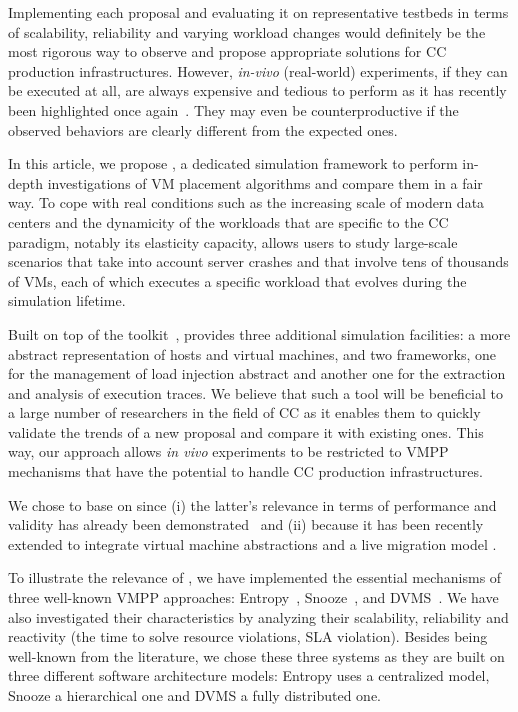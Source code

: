 Implementing each proposal and evaluating it on representative
testbeds in terms of scalability, reliability and varying workload
changes would definitely be the most rigorous way to observe and
propose appropriate solutions for CC production infrastructures.
However, \textit{in-vivo} (\ie real-world) experiments, if they can be
executed at all, are always expensive and tedious to perform as it has
recently been highlighted once again~\cite{barker:pitfalls}. They may
even be counterproductive if the observed behaviors are clearly
different from the expected ones.

In this article, we propose \vmps, a dedicated simulation framework to
perform in-depth investigations of VM placement algorithms and compare
them in a fair way. To cope with real conditions such as the
increasing scale of modern data centers and the dynamicity of the
workloads that are specific to the CC paradigm, notably its elasticity
capacity, \vmps allows users to study large-scale scenarios that take
into account server crashes and that involve tens of thousands of VMs,
each of which executes a specific workload that evolves during the
simulation lifetime.

Built on top of the \sg toolkit~\cite{casanova:hal-01017319}, \vmps
provides three additional simulation facilities: a more abstract
representation of hosts and virtual machines, and two frameworks, one
for the management of load injection abstract and another one for the
extraction and analysis of execution traces. We believe that such a
tool will be beneficial to a large number of researchers in the field
of CC as it enables them to quickly validate
the trends of a new proposal and compare it with existing
ones. This way, our approach allows \textit{in vivo} experiments to be
restricted to VMPP mechanisms that have the potential to handle CC
production infrastructures.

%
We chose to base \vmps on \sg since (i) the latter's relevance in
terms of performance and validity has already been
demonstrated~\cite{simgridpub} and (ii) because it has been recently
extended to integrate virtual machine abstractions and a live
migration model \cite{Hirofuchi:2013:ALM:2568486.2568524}.

To illustrate the relevance of \vmps, we have implemented the
essential mechanisms of three well-known VMPP approaches:
Entropy~\cite{Hermenier:2009:ECM:1508293.1508300},
Snooze~\cite{feller:ccgrid12}, and DVMS~\cite{quesnel:cpe2012}. We
have also investigated their characteristics by analyzing their
scalability, reliability and reactivity (\ie the time to solve resource
violations, \aka SLA violation). Besides being well-known from the literature, we chose
these three systems as they are built on three different software
architecture models: Entropy uses a centralized model, Snooze a
hierarchical one and DVMS a fully distributed one.

